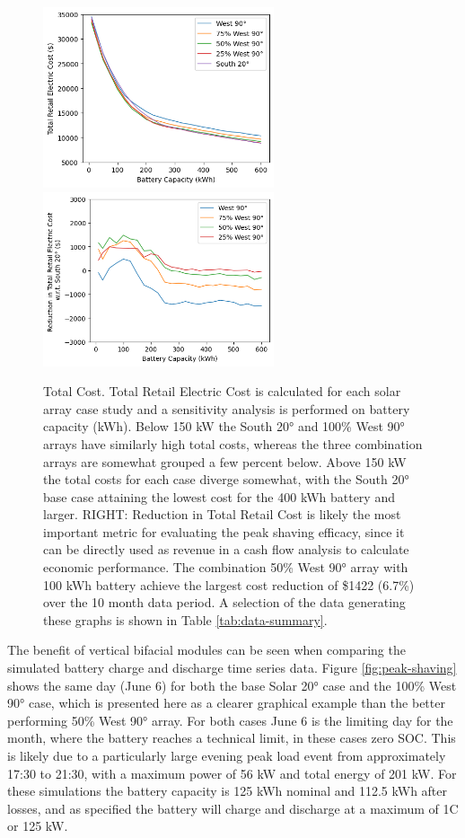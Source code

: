 \documentclass[journal,article,submit,pdftex,moreauthors]{Definitions/mdpi}
\begin{document}
\begin{figure}[!h]
  \centering
  \includegraphics[width=6.8cm]{./images/total cost.png}
  \includegraphics[width=6.8cm]{./images/total cost reduction.png}
  \caption{Total Cost. Total Retail Electric Cost is calculated for each
  solar array case study and a sensitivity analysis is performed on
  battery capacity (kWh). Below 150 kW the South 20° and 100\% West 90°
  arrays have similarly high total costs, whereas the three combination
  arrays are somewhat grouped a few percent below. Above 150 kW the total
  costs for each case diverge somewhat, with the South 20° base case
  attaining the lowest cost for the 400 kWh battery and larger.
  RIGHT: Reduction in Total Retail Cost is likely the most important metric for
  evaluating the peak shaving efficacy, since it can be directly used as
  revenue in a cash flow analysis to calculate economic performance. The
  combination 50\% West 90° array with 100 kWh battery achieve the largest
  cost reduction of \$1422 (6.7\%) over the 10 month data period. A
  selection of the data generating these graphs is shown in Table \ref{tab:data-summary}.}
  \label{fig:total-cost}
\end{figure}

The benefit of vertical bifacial modules can be seen when comparing the
simulated battery charge and discharge time series data. Figure \ref{fig:peak-shaving} shows
the same day (June 6) for both the base Solar 20° case and the 100\%
West 90° case, which is presented here as a clearer graphical example
than the better performing 50\% West 90° array. For both cases June 6 is
the limiting day for the month, where the battery reaches a technical
limit, in these cases zero SOC. This is likely due to a particularly
large evening peak load event from approximately 17:30 to 21:30, with a
maximum power of 56 kW and total energy of 201 kW. For these simulations
the battery capacity is 125 kWh nominal and 112.5 kWh after losses, and
as specified the battery will charge and discharge at a maximum of 1C or
125 kW.
\end{document}
